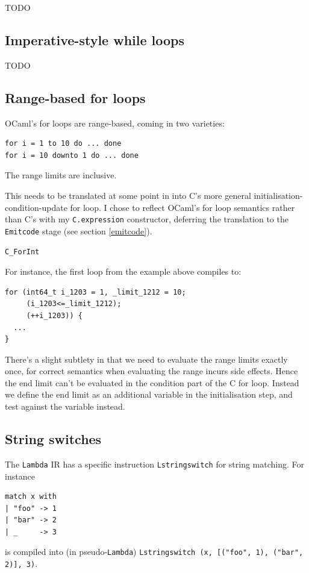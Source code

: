 \documentclass[12pt,a4paper,twoside,openright]{report}
\begin{document}
TODO

\subsection{Imperative-style while loops}\label{while-loops}

TODO

\subsection{Range-based for loops}\label{for-loops}

OCaml's for loops are range-based, coming in two varieties:
\begin{lstlisting}
for i = 1 to 10 do ... done
for i = 10 downto 1 do ... done
\end{lstlisting}

The range limits are inclusive.

This needs to be translated at some point in into C's more general
initialisation-condition-update for loop. I chose to reflect OCaml's for loop
semantics rather than C's with my \lstinline!C.expression!
constructor, deferring the translation to the \lstinline!Emitcode! stage (see
section \ref{emitcode}).

\lstinline!C_ForInt!

For instance, the first loop from the example above
compiles to:

\begin{lstlisting}
for (int64_t i_1203 = 1, _limit_1212 = 10;
     (i_1203<=_limit_1212);
     (++i_1203)) {
  ...
}
\end{lstlisting}

There's a slight subtlety in that we need to evaluate the range limits exactly
once, for correct semantics when evaluating the range incurs side effects.
Hence the end limit can't be evaluated in the condition part of the C for loop.
Instead we define the end limit as an additional variable in the initialisation
step, and test against the variable instead.

\subsection{String switches}\label{stringswitch}

The \lstinline!Lambda! IR has a specific instruction \lstinline!Lstringswitch!
for string matching. For instance
\begin{lstlisting}
match x with
| "foo" -> 1
| "bar" -> 2
| _     -> 3\end{lstlisting}
is compiled into (in pseudo-\lstinline!Lambda!)
\lstinline!Lstringswitch (x, [("foo", 1), ("bar", 2)], 3)!.
\end{document}

